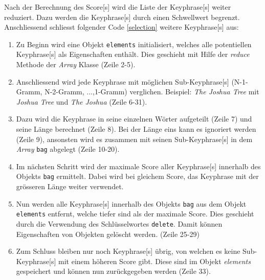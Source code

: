 Nach der Berechnung des \gls{Score}[s] wird die Liste der \gls{Keyphrase}[s] weiter reduziert. Dazu werden die \gls{Keyphrase}[s] durch einen Schwellwert begrenzt. Anschliessend schliesst folgender Code \autoref{selection} weitere \gls{Keyphrase}[s] aus:
\begin{enumerate}
    \item Zu Beginn wird eine Objekt \texttt{elements} initialisiert, welches alle potentiellen \gls{Keyphrase}[s] als Eigenschaften enthält. Dies geschieht mit Hilfe der \textit{reduce} Methode der \textit{Array} Klasse (Zeile 2-5).\\
    \item Anschliessend wird jede \gls{Keyphrase} mit möglichen Sub-\gls{Keyphrase}[s] (N-1-Gramm, N-2-Gramm, ...,1-Gramm) verglichen. Beispiel: \textit{The Joshua Tree} mit \textit{Joshua Tree} und \textit{The Joshua} (Zeile 6-31).\\
    \item Dazu wird die \gls{Keyphrase} in seine einzelnen Wörter aufgeteilt (Zeile 7) und seine Länge berechnet (Zeile 8). Bei der Länge eins kann es ignoriert werden (Zeile 9), ansonsten wird es zusammen mit seinen Sub-\gls{Keyphrase}[s] in dem \textit{Array} \texttt{bag} abgelegt (Zeile 10-20).\\
    \item Im nächsten Schritt wird der maximale \gls{Score} aller \gls{Keyphrase}[s] innerhalb des Objekts \texttt{bag} ermittelt. Dabei wird bei gleichem \gls{Score}, das \gls{Keyphrase} mit der grösseren Länge weiter verwendet.\\
    \item Nun werden alle \gls{Keyphrase}[s] innerhalb des Objekts \texttt{bag} aus dem Objekt \texttt{elements} entfernt, welche tiefer sind als der maximale \gls{Score}. Dies geschieht durch die Verwendung des Schlüs\-sel\-wort\-es \texttt{delete}. Damit können Eigenschaften von Objekten gelöscht werden. (Zeile 25-29)\\
    \item Zum Schluss bleiben nur noch \gls{Keyphrase}[s] übrig, von welchen es keine Sub-\gls{Keyphrase}[s] mit einem höheren \gls{Score} gibt. Diese sind im Objekt \textit{elements} gespeichert und können nun zu\-rück\-ge\-ge\-ben werden (Zeile 33).
\end{enumerate}




